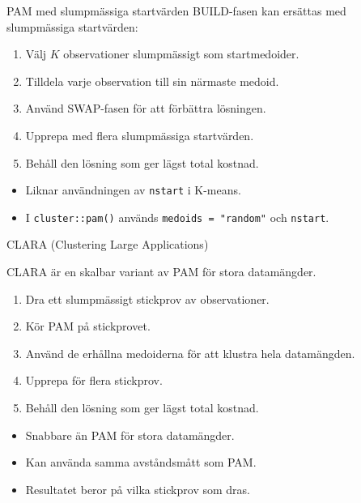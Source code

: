 \documentclass[10pt,english]{beamer}
\begin{document}
\begin{frame}{PAM med slumpmässiga startvärden}
    BUILD-fasen kan ersättas med slumpmässiga startvärden:

    \begin{enumerate}
        \item Välj $K$ observationer slumpmässigt som startmedoider.

        \item Tilldela varje observation till sin närmaste medoid.

        \item Använd SWAP-fasen för att förbättra lösningen.

        \item Upprepa med flera slumpmässiga startvärden.

        \item Behåll den lösning som ger lägst total kostnad.
    \end{enumerate}

    \vspace{0.2cm}

    \begin{itemize}
        \item Liknar användningen av \texttt{nstart} i K-means.
        \item I \texttt{cluster::pam()} används
              \texttt{medoids = "random"} och \texttt{nstart}.
    \end{itemize}
\end{frame}

\begin{frame}{CLARA (Clustering Large Applications)}

    CLARA är en skalbar variant av PAM för stora datamängder.

    \begin{enumerate}
        \item Dra ett slumpmässigt stickprov av observationer.

        \item Kör PAM på stickprovet.

        \item Använd de erhållna medoiderna för att klustra
              hela datamängden.

        \item Upprepa för flera stickprov.

        \item Behåll den lösning som ger lägst total kostnad.
    \end{enumerate}

    \vspace{0.2cm}

    \begin{itemize}
        \item Snabbare än PAM för stora datamängder.
        \item Kan använda samma avståndsmått som PAM.
        \item Resultatet beror på vilka stickprov som dras.
    \end{itemize}

\end{frame}
\end{document}
